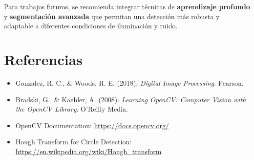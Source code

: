 \documentclass[conference]{IEEEtran}
\begin{document}
Para trabajos futuros, se recomienda integrar técnicas de \textbf{aprendizaje profundo} y \textbf{segmentación avanzada} que permitan una detección más robusta y adaptable a diferentes condiciones de iluminación y ruido.

\section{Referencias}
\begin{itemize}
    \item Gonzalez, R. C., \& Woods, R. E. (2018). \textit{Digital Image Processing}. Pearson.
    \item Bradski, G., \& Kaehler, A. (2008). \textit{Learning OpenCV: Computer Vision with the OpenCV Library}. O'Reilly Media.
    \item OpenCV Documentation: \url{https://docs.opencv.org/}
    \item Hough Transform for Circle Detection: \url{https://en.wikipedia.org/wiki/Hough_transform}
\end{itemize}
\end{document}
